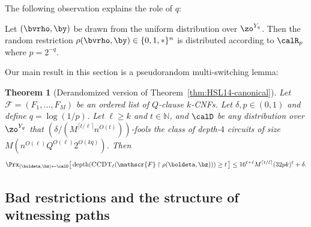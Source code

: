 \documentclass[11pt]{article}
\numberwithin{equation}{section}
\newtheorem{theorem}{Theorem}[section]
\theoremstyle{definition}
\theoremstyle{plain}
\newcommand{\N}{\mathbb N}
\theoremstyle{plain}
\newcommand{\uhr}{\upharpoonright}
\newcommand{\CCDT}{\textsc{CCDT}}
\newcommand{\depth}{\mathrm{depth}}
\renewcommand{\N}{\mathds{N}}
\begin{document}
The following observation explains the role of $q$: 


\begin{observation}
\label{obs:string-to-restriction}
Let $(\bvrho,\by)$ be drawn from the uniform distribution over $\zo^{Y_q}$.  Then the random restriction $\rho(\bvrho,\by) \in \{0,1,\ast\}^n$ is distributed according to $\calR_p$ where $p = 2^{-q}$.
\end{observation} 



Our main result in this section is a pseudorandom multi-switching lemma: 



\begin{theorem}[Derandomized version of Theorem~\ref{thm:HSL14-canonical}]
\label{thm:derand-H14}
Let $\mathscr{F} = (F_1,\ldots,F_M)$ be an ordered list of $Q$-clause $k$-CNFs. Let $\delta,p \in (0,1)$ and define $q = \log(1/p)$.  Let $\ell \geq k$ and $t\in \N$, and 
$\calD$ be any distribution over $\zo^{Y_q}$ that $(\delta/(M^{\lceil t/\ell\rceil} n^{O(t)}))$-fools the class of depth-$4$ circuits of size $M(n^{O(\ell)} Q^{O(\ell)} 2^{O(kq)})$.   Then
\[ \Prx_{(\boldeta,\bz)\leftarrow\calD}\big[\, \depth(\CCDT_{\ell}(\mathscr{F}\uhr\rho(\boldeta,\bz))) \ge t\,\big] \le 16^{t+\ell}M^{\lceil t/\ell\rceil} (32pk)^t + \delta. \]
 \end{theorem} 







\subsection{Bad restrictions and the structure of witnessing paths} 
\label{sec:bad-restrictions}
\end{document}
